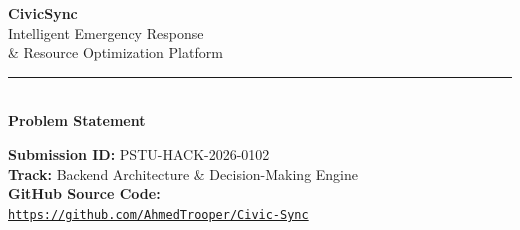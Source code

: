 \documentclass[10pt,letterpaper]{article}
\begin{document}

\vspace*{2.0cm}

\begin{center}
    {\Huge \textbf{CivicSync}}\\[10pt]
    {\LARGE Intelligent Emergency Response}\\[2pt]
    {\LARGE \& Resource Optimization Platform}\\[20pt]

    \rule{0.5\textwidth}{0.5pt}\\[14pt]

    {\Large \textbf{Problem Statement}}\\[16pt]

    \begin{tcolorbox}[colback=csbg, colframe=csblue, boxrule=0.6pt, arc=4pt,
        left=12pt, right=12pt, top=10pt, bottom=10pt,
        width=0.85\textwidth]
    \large
    \textbf{Submission ID:} PSTU-HACK-2026-0102\\[4pt]
    \textbf{Track:} Backend Architecture \& Decision-Making Engine\\[4pt]
    \textbf{GitHub Source Code:} \\
    \texttt{\href{https://github.com/AhmedTrooper/Civic-Sync}{https://github.com/AhmedTrooper/Civic-Sync}}
    \end{tcolorbox}
\end{center}

\clearpage

\end{document}
